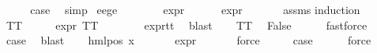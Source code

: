 \begin{isabellebody}
\ \ \isamarkupfalse%
\ \isamarkupfalse%
\ {\isacharquery}{\kern0pt}case\ \isamarkupfalse%
\ simp\isanewline
{}\isamarkupfalse%
%
\endisatagproof
{\isafoldproof}%
%
\isadelimproof
\isanewline
%
\endisadelimproof
\isanewline
\isanewline
{}\isamarkupfalse%
\ e{}{\isacharunderscore}{\kern0pt}e{}{\isacharunderscore}{\kern0pt}ge{\isacharunderscore}{\kern0pt}{}{\isacharcolon}{\kern0pt}\ \isanewline
\ \ \ {\isasymphi}\isanewline
\ \ \ {\isachardoublequoteopen}expr{\isacharunderscore}{\kern0pt}{}\ {\isasymphi}\ {\isasymge}\ {}{\isachardoublequoteclose}\isanewline
\ \ \ {\isachardoublequoteopen}expr{\isacharunderscore}{\kern0pt}{}\ {\isasymphi}\ {\isasymge}\ {}{\isachardoublequoteclose}\isanewline
%
\isadelimproof
\ \ %
\endisadelimproof
%
\isatagproof
{}\isamarkupfalse%
\ assms\isanewline
{}\isamarkupfalse%
{\isacharparenleft}{\kern0pt}induction\ {\isasymphi}{\isacharparenright}{\kern0pt}\isanewline
\ \ \isamarkupfalse%
\ TT\isanewline
\ \ \isamarkupfalse%
\ \isamarkupfalse%
\ {\isachardoublequoteopen}expr{\isacharunderscore}{\kern0pt}{}\ TT\ {\isacharequal}{\kern0pt}\ {}{\isachardoublequoteclose}\isanewline
\ \ \ \ \isamarkupfalse%
\ expr{\isacharunderscore}{\kern0pt}{}{\isacharunderscore}{\kern0pt}tt\ \isamarkupfalse%
\ blast\isanewline
\ \ \isamarkupfalse%
\ TT\ \isamarkupfalse%
\ False\isanewline
\ \ \ \ \isamarkupfalse%
\ fastforce\isanewline
\ \ \isamarkupfalse%
\ \isamarkupfalse%
\ {\isacharquery}{\kern0pt}case\ \isamarkupfalse%
\ blast\isanewline
{}\isamarkupfalse%
\isanewline
\ \ \isamarkupfalse%
\ {\isacharparenleft}{\kern0pt}hml{\isacharunderscore}{\kern0pt}pos\ x{}\ {\isasymphi}{\isacharparenright}{\kern0pt}\isanewline
\ \ \isamarkupfalse%
\ {\isachardoublequoteopen}{}\ {\isasymle}\ expr{\isacharunderscore}{\kern0pt}{}\ {\isasymphi}{\isachardoublequoteclose}\isanewline
\ \ \ \ \isamarkupfalse%
\ force\isanewline
\ \ \isamarkupfalse%
\ \isamarkupfalse%
\ {\isacharquery}{\kern0pt}case\isanewline
\ \ \ \ \isamarkupfalse%
\ force\isanewline
{}\isamarkupfalse%

\end{isabellebody}
